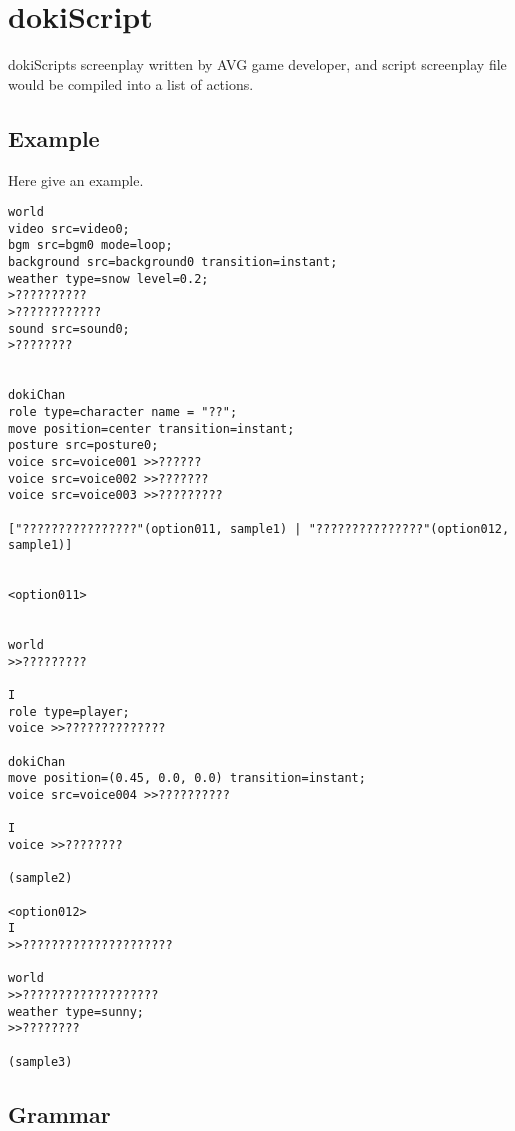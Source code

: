 \chapter{dokiScript}

dokiScripts screenplay written by AVG game developer, and script screenplay file would be compiled into a list of actions.

\section{Example}

Here give an example.

\begin{lstlisting}
world
video src=video0;
bgm src=bgm0 mode=loop;
background src=background0 transition=instant;
weather type=snow level=0.2;
>??????????
>????????????
sound src=sound0;
>????????


dokiChan
role type=character name = "??"; 
move position=center transition=instant; 
posture src=posture0; 
voice src=voice001 >>??????
voice src=voice002 >>???????
voice src=voice003 >>?????????

["????????????????"(option011, sample1) | "???????????????"(option012, sample1)] 


<option011>


world
>>?????????

I
role type=player;
voice >>??????????????

dokiChan
move position=(0.45, 0.0, 0.0) transition=instant; 
voice src=voice004 >>??????????

I
voice >>????????

(sample2)

<option012>
I
>>????????????????????? 

world
>>??????????????????? 
weather type=sunny; 
>>????????

(sample3)
\end{lstlisting}

\section{Grammar}


